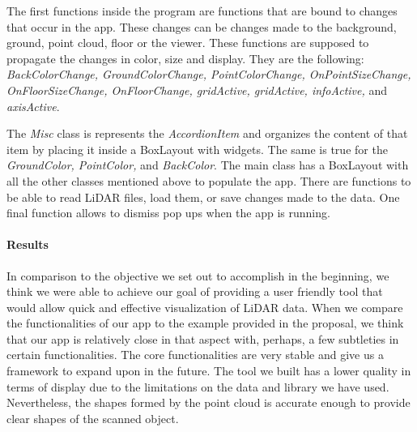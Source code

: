 \documentclass[12pt]{report}
\begin{document}
\vspace{\baselineskip}
\begin{FlushLeft}
The first functions inside the program are functions that are bound to changes that occur in the app. These changes can be changes made to the background, ground, point cloud, floor or the viewer. These functions are supposed to propagate the changes in color, size and display. They are the following: \textit{BackColorChange, GroundColorChange, PointColorChange, OnPointSizeChange, OnFloorSizeChange, OnFloorChange, gridActive, gridActive, infoActive, }and \textit{axisActive}. 
\end{FlushLeft}\par


\vspace{\baselineskip}
\begin{FlushLeft}
The \textit{Misc }class is represents the \textit{AccordionItem }and organizes the content of that item by placing it inside a BoxLayout with widgets. The same is true for the \textit{GroundColor, PointColor, }and \textit{BackColor}. The main class has a BoxLayout with all the other classes mentioned above to populate the app.\textit{ }There are functions to be able to read LiDAR files, load them, or save changes made to the data. One final function allows to dismiss pop ups when the app is running.
\end{FlushLeft}\par


\vspace{\baselineskip}
\paragraph*{Results}
\tab 
\vspace{\baselineskip}\begin{FlushLeft}
In comparison to the objective we set out to accomplish in the beginning, we think we were able to achieve our goal of providing a user friendly tool that would allow quick and effective visualization of LiDAR data. When we compare the functionalities of our app to the example provided in the proposal, we think that our app is relatively close in that aspect with, perhaps, a few subtleties in certain functionalities. The core functionalities are very stable and give us a framework to expand upon in the future. The tool we built has a lower quality in terms of display due to the limitations on the data and library we have used. Nevertheless, the shapes formed by the point cloud is accurate enough to provide clear shapes of the scanned object.
\end{FlushLeft}\par
\end{document}
